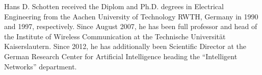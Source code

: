 \documentclass{ieeeaccess}
\begin{document}
	\vfill
   
   \begin{IEEEbiography}[{\texttt{[image: hs]}}]{Hans D. Schotten} received the Diplom and Ph.D. degrees in Electrical Engineering from the Aachen University of Technology RWTH, Germany in 1990 and 1997, respectively. Since August 2007, he has been full professor and head of the Institute of Wireless Communication at the Technische Universit\"at Kaiserslautern. Since 2012, he has additionally been Scientific Director at the German Research Center for Artificial Intelligence heading the ``Intelligent Networks'' department.
   \end{IEEEbiography}

	
	\EOD
	
\end{document}
